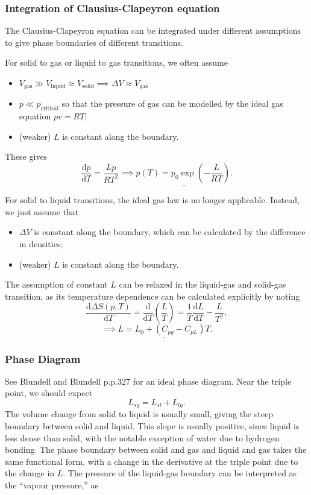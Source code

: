 \documentclass{article}
\theoremstyle{nonumberplain}
\begin{document}
\subsubsection{Integration of Clausius-Clapeyron equation}
The Clausius-Clapeyron equation can be integrated under different assumptions to give phase boundaries of different transitions. 

For solid to gas or liquid to gas transitions, we often assume 
\begin{itemize}
    \item $V_{\mathrm{gas} } \gg  V_{\mathrm{liquid} } \approx V_{\mathrm{solid} } \implies \Delta V \approx V_{\mathrm{gas} }$
    \item $p \ll p_{\mathrm{critical}}$ so that the pressure of gas can be modelled by the ideal gas equation $p v = R T;$
    \item (weaker) $L$ is constant along the boundary.
\end{itemize}
These gives
\[
    \frac{\mathrm{d}p}{\mathrm{d}T} = \frac{L p}{R T^{2}}
    \implies  
    \underline{p(T) = p_0 \exp \left( -\frac{L}{RT}\right).} 
\]

For solid to liquid transitions, the ideal gas law is no longer applicable. Instead, we just assume that
\begin{itemize}
    \item $\Delta V$ is constant along the boundary, which can be calculated by the difference in densities;
    \item (weaker) $L$ is constant along the boundary.
\end{itemize}

The assumption of constant $L$ can be relaxed in the liquid-gas and solid-gas transition, as its temperature dependence can be calculated explicitly by noting 
\[
    \frac{\mathrm{d}\Delta S(p,T)}{\mathrm{d}T} = \frac{\mathrm{d}}{\mathrm{d}T} \left(\frac{L}{T} \right) = \frac{1}{T}\frac{\mathrm{d}L}{\mathrm{d}T} - \frac{L}{T^2},
\]
\[
    \implies  
    \underline{L = L_0 + (C_{pg} - C_{pL}) T}. 
\]

\subsubsection{Phase Diagram}
See Blundell and Blundell p.p.327 for an ideal phase diagram. Near the triple point, we should expect 
\[
    L_{sg} = L_{sl} + L_{lg}. 
\]
The volume change from solid to liquid is usually small, giving the steep boundary between solid and liquid. This slope is usually positive, since liquid is less dense than solid, with the notable exception of water due to hydrogen bonding. The phase boundary between solid and gas and liquid and gas takes the same functional form, with a change in the derivative at the triple point due to the change in $L.$ The pressure of the liquid-gas boundary can be interpreted as the ``vapour pressure,'' as 
\end{document}
